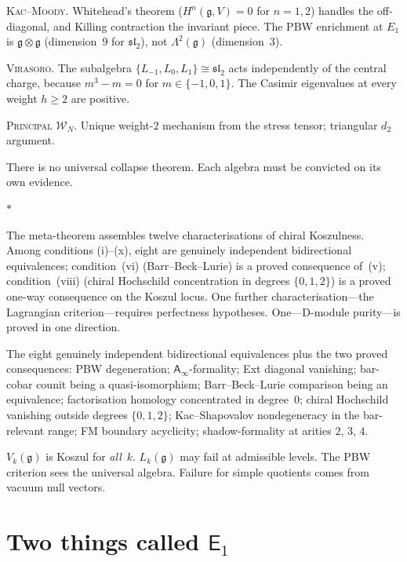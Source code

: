 \documentclass[11pt]{article}
\newcommand{\cW}{\mathcal{W}}
\newcommand{\fg}{\mathfrak{g}}
\newcommand{\fsl}{\mathfrak{sl}}
\newcommand{\Eone}{\mathsf{E}_1}
\newcommand{\Ainf}{\mathsf{A}_{\infty}}
\newcommand{\sep}{\bigskip\begin{center}$*$\end{center}\medskip}
\begin{document}
\medskip
\noindent\textsc{Kac--Moody.}\enspace
Whitehead's theorem ($H^n(\fg, V) = 0$ for $n = 1,2$) handles
the off-diagonal, and Killing contraction the invariant piece.
The PBW enrichment at $E_1$ is $\fg \otimes \fg$ (dimension~$9$
for $\fsl_2$), not $\Lambda^2(\fg)$ (dimension~$3$).

\medskip
\noindent\textsc{Virasoro.}\enspace
The subalgebra $\{L_{-1}, L_0, L_1\} \cong \fsl_2$ acts
independently of the central charge, because $m^3 - m = 0$ for
$m \in \{-1,0,1\}$.  The Casimir eigenvalues at every weight
$h \geq 2$ are positive.

\medskip
\noindent\textsc{Principal $\cW_N$.}\enspace
Unique weight-$2$ mechanism from the stress tensor; triangular
$d_2$ argument.

\medskip

There is no universal collapse theorem.  Each algebra must be
convicted on its own evidence.

\sep

The meta-theorem assembles twelve characterisations of chiral
Koszulness.  Among conditions (i)--(x), eight are genuinely independent
bidirectional equivalences; condition~(vi) (Barr--Beck--Lurie) is a
proved consequence of~(v); condition~(viii) (chiral Hochschild
concentration in degrees $\{0,1,2\}$) is a proved one-way consequence
on the Koszul locus.
One further characterisation---the Lagrangian criterion---requires
perfectness hypotheses.
One---D-module purity---is proved in one direction.

The eight genuinely independent bidirectional equivalences plus the two
proved consequences:
PBW degeneration;
$\Ainf$-formality;
Ext diagonal vanishing;
bar-cobar counit being a quasi-isomorphism;
Barr--Beck--Lurie comparison being an equivalence;
factorisation homology concentrated in degree~$0$;
chiral Hochschild vanishing outside degrees $\{0,1,2\}$;
Kac--Shapovalov nondegeneracy in the bar-relevant range;
FM boundary acyclicity;
shadow-formality at arities $2$, $3$, $4$.

$V_k(\fg)$ is Koszul for \emph{all}~$k$.  $L_k(\fg)$ may fail at
admissible levels.  The PBW criterion sees the universal algebra.
Failure for simple quotients comes from vacuum null vectors.


\section{Two things called $\Eone$}
\label{sec:two-e1}
\end{document}

